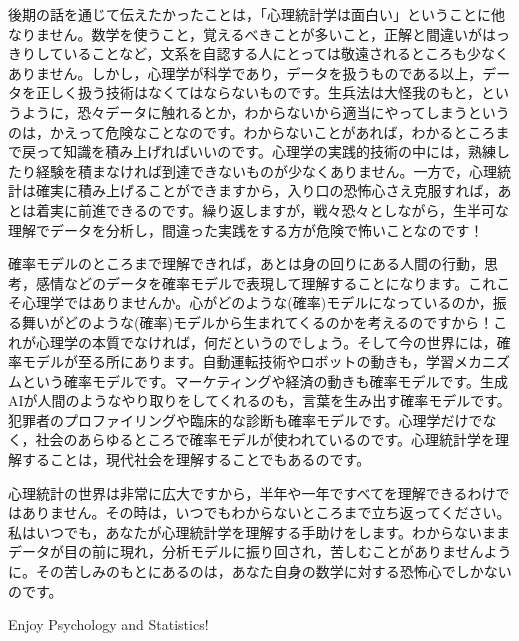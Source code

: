 \documentclass{ltjbook}
\begin{document}
後期の話を通じて伝えたかったことは，「心理統計学は面白い」ということに他なりません。数学を使うこと，覚えるべきことが多いこと，正解と間違いがはっきりしていることなど，文系を自認する人にとっては敬遠されるところも少なくありません。しかし，心理学が科学であり，データを扱うものである以上，データを正しく扱う技術はなくてはならないものです。生兵法は大怪我のもと，というように，恐々データに触れるとか，わからないから適当にやってしまうというのは，かえって危険なことなのです。わからないことがあれば，わかるところまで戻って知識を積み上げればいいのです。心理学の実践的技術の中には，熟練したり経験を積まなければ到達できないものが少なくありません。一方で，心理統計は確実に積み上げることができますから，入り口の恐怖心さえ克服すれば，あとは着実に前進できるのです。繰り返しますが，戦々恐々としながら，生半可な理解でデータを分析し，間違った実践をする方が危険で怖いことなのです！

確率モデルのところまで理解できれば，あとは身の回りにある人間の行動，思考，感情などのデータを確率モデルで表現して理解することになります。これこそ心理学ではありませんか。心がどのような(確率)モデルになっているのか，振る舞いがどのような(確率)モデルから生まれてくるのかを考えるのですから！これが心理学の本質でなければ，何だというのでしょう。そして今の世界には，確率モデルが至る所にあります。自動運転技術やロボットの動きも，学習メカニズムという確率モデルです。マーケティングや経済の動きも確率モデルです。生成AIが人間のようなやり取りをしてくれるのも，言葉を生み出す確率モデルです。犯罪者のプロファイリングや臨床的な診断も確率モデルです。心理学だけでなく，社会のあらゆるところで確率モデルが使われているのです。心理統計学を理解することは，現代社会を理解することでもあるのです。

心理統計の世界は非常に広大ですから，半年や一年ですべてを理解できるわけではありません。その時は，いつでもわからないところまで立ち返ってください。私はいつでも，あなたが心理統計学を理解する手助けをします。わからないままデータが目の前に現れ，分析モデルに振り回され，苦しむことがありませんように。その苦しみのもとにあるのは，あなた自身の数学に対する恐怖心でしかないのです。

Enjoy Psychology and Statistics!
\end{document}
